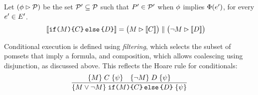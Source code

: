 \begin{definition}
  Let $(\phi \mathbin\rhd \mathcal{P})$ be the set $\mathcal{P}'\subseteq\mathcal{P}$ such that
  $P'\in\mathcal{P}'$ when $\phi$ implies $\Phi(e')$, for every
  $e'\in E'$. 
  \begin{align*}
    \llbracket\texttt{if}\allowbreak\texttt{(}M\texttt{)} \allowbreak\texttt{\{} C \texttt{\}}\,\allowbreak\texttt{else}\allowbreak\,\texttt{\{} D \texttt{\}}\rrbracket & =
  \bigl(M \mathbin\rhd \llbracket C\rrbracket\bigr) \parallel \bigl(\lnot M \mathbin\rhd \llbracket D\rrbracket\bigr) 
\end{align*}
\end{definition}
Conditional execution is defined using \emph{filtering}, which selects the
subset of pomsets that imply a formula, and composition, which allows
coalescing using disjunction, as discussed above.  This reflects the Hoare
rule for conditionals:
\begin{displaymath}
  \frac{
    \{M\}\allowbreak\;C\;\allowbreak\{\psi\}
    \quad
    \{\lnot M\}\allowbreak\;D\;\allowbreak\{\psi\}
  }{
    \{M\lor \lnot M\}\allowbreak\;\texttt{if}\allowbreak\texttt{(}M\texttt{)}\allowbreak\texttt{\{} C \texttt{\}}\,\allowbreak\texttt{else}\allowbreak\,\texttt{\{} D\texttt{\}}\;\allowbreak\{\psi\}
  }
\end{displaymath}

